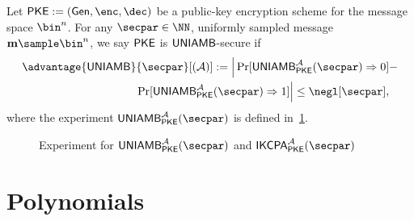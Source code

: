 \begin{definition}
\label{def:ambiguous}
Let $\pke := (\gen, \enc, \dec)$ be a public-key encryption scheme for the message
space $\bin^n$. For any $\secpar\in\NN$, uniformly sampled message $\mn\sample\bin^n$, we say $\mathsf{PKE}$ is $\mathsf{UNIAMB}$-secure if
\begin{align*}
    \advantage{\uniamb}{\secpar}[(\Ac)] :=
    \Big|\Pr[\uniamb^\Ac_\pke(\secpar)\Rightarrow 0] &-\\\Pr[\uniamb^\Ac_\pke(\secpar)\Rightarrow 1] \Big|
    \le \negl[\secpar],
\end{align*}
where the experiment $\uniamb^\Ac_\pke(\secpar)$ is defined in~\cref{fig:experiment_ambiguous}.
\begin{figure}[!t]
\centering
    \begin{pchstack}[boxed]

    \pchspace
    \end{pchstack}
    \caption{Experiment for $\uniamb^\Ac_\pke(\secpar)$ and $\ikcpa^\Ac_\pke(\secpar)$}
    \label{fig:experiment_ambiguous}
\end{figure}

\end{definition}



\section{Polynomials}

